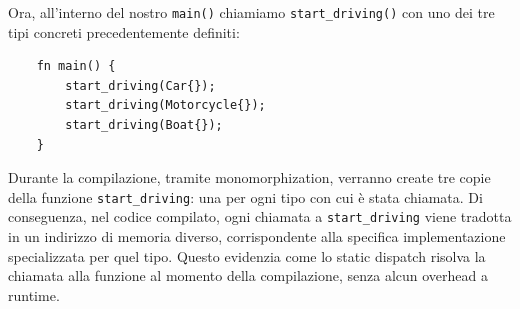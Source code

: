 Ora, all'interno del nostro \texttt{main()} chiamiamo \texttt{start\_driving()} con uno dei tre tipi concreti precedentemente definiti:
\begin{verbatim}
    fn main() {
        start_driving(Car{});
        start_driving(Motorcycle{});
        start_driving(Boat{});
    }
\end{verbatim}
Durante la compilazione, tramite monomorphization, verranno create tre copie della funzione \texttt{start\_driving}: una per ogni tipo con cui è stata chiamata. Di conseguenza, nel codice compilato, ogni chiamata a \texttt{start\_driving} viene tradotta in un indirizzo di memoria diverso, corrispondente alla specifica implementazione specializzata per quel tipo. Questo evidenzia come lo static dispatch risolva la chiamata alla funzione al momento della compilazione, senza alcun overhead a runtime.
